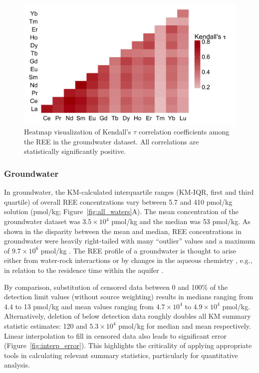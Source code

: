 \begin{figure}[htbp]
\begin{center}
\includegraphics[width=\textwidth]{Ch3_figures/GW-ken-tau.png}
\caption{Heatmap visualization of Kendall's $\tau$ correlation coefficients among the REE in the groundwater dataset.
All correlations are statistically significantly positive.}\label{fig:REE_ken}
\end{center}
\end{figure}

\subsubsection{Groundwater}

In groundwater, the KM-calculated interquartile ranges (KM-IQR, first and third quartile) of overall REE concentrations vary between 5.7 and 410 pmol/kg solution (pmol/kg; Figure~\ref{fig:all_waters}A).
The mean concentration of the groundwater dataset was $3.5 \times 10^4$ pmol/kg and the median was 53 pmol/kg.
As shown in the disparity between the mean and median, REE concentrations in groundwater were heavily right-tailed with many ``outlier'' values and a maximum of $9.7 \times 10^6$ pmol/kg \citep{Miekeley_JGE_1992}.
The REE profile of a groundwater is thought to arise either from water-rock interactions \citep{Willis_CG_2011, Smedley_GCA_1991}
or by changes in the aqueous chemistry \citep{Dia_GCA_2000},
e.g., in relation to the residence time within the aquifer \citep{Johannesson_GW_1997, BwireOjiambo_AG_2003}.

By comparison, substitution of censored data between 0 and 100\% of the detection limit values (without source weighting) results in medians ranging from 4.4 to 13 pmol/kg and mean values ranging from $4.7 \times 10^4$ to $4.9\times 10^4$ pmol/kg.
Alternatively, deletion of below detection data roughly doubles all KM summary statistic estimates: 120 and $5.3\times 10^4$ pmol/kg for median and mean respectively.
Linear interpolation to fill in censored data also leads to significant error (Figure~\ref{fig:interp_error}).
This highlights the criticality of applying appropriate tools in calculating relevant summary statistics, particularly for quantitative analysis.

